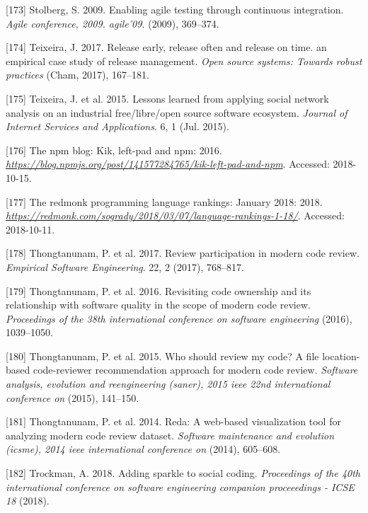 \documentclass[]{book}
\begin{document}
\hypertarget{ref-stolberg2009enabling}{}
{[}173{]} Stolberg, S. 2009. Enabling agile testing through continuous
integration. \emph{Agile conference, 2009. agile'09.} (2009), 369--374.

\hypertarget{ref-teixeira2017a}{}
{[}174{]} Teixeira, J. 2017. Release early, release often and release on
time. an empirical case study of release management. \emph{Open source
systems: Towards robust practices} (Cham, 2017), 167--181.

\hypertarget{ref-Teixeira2015}{}
{[}175{]} Teixeira, J. et al. 2015. Lessons learned from applying social
network analysis on an industrial free/libre/open source software
ecosystem. \emph{Journal of Internet Services and Applications}. 6, 1
(Jul. 2015).

\hypertarget{ref-NPM2016}{}
{[}176{]} The npm blog: Kik, left-pad and npm: 2016.
\emph{\url{https://blog.npmjs.org/post/141577284765/kik-left-pad-and-npm}}.
Accessed: 2018-10-15.

\hypertarget{ref-RedMonk2018}{}
{[}177{]} The redmonk programming language rankings: January 2018: 2018.
\emph{\url{https://redmonk.com/sogrady/2018/03/07/language-rankings-1-18/}}.
Accessed: 2018-10-11.

\hypertarget{ref-thongtanunam2017review}{}
{[}178{]} Thongtanunam, P. et al. 2017. Review participation in modern
code review. \emph{Empirical Software Engineering}. 22, 2 (2017),
768--817.

\hypertarget{ref-thongtanunam2016revisiting}{}
{[}179{]} Thongtanunam, P. et al. 2016. Revisiting code ownership and
its relationship with software quality in the scope of modern code
review. \emph{Proceedings of the 38th international conference on
software engineering} (2016), 1039--1050.

\hypertarget{ref-thongtanunam2015should}{}
{[}180{]} Thongtanunam, P. et al. 2015. Who should review my code? A
file location-based code-reviewer recommendation approach for modern
code review. \emph{Software analysis, evolution and reengineering
(saner), 2015 ieee 22nd international conference on} (2015), 141--150.

\hypertarget{ref-thongtanunam2014reda}{}
{[}181{]} Thongtanunam, P. et al. 2014. Reda: A web-based visualization
tool for analyzing modern code review dataset. \emph{Software
maintenance and evolution (icsme), 2014 ieee international conference
on} (2014), 605--608.

\hypertarget{ref-Trockman2018}{}
{[}182{]} Trockman, A. 2018. Adding sparkle to social coding.
\emph{Proceedings of the 40th international conference on software
engineering companion proceeedings - ICSE 18} (2018).
\end{document}
